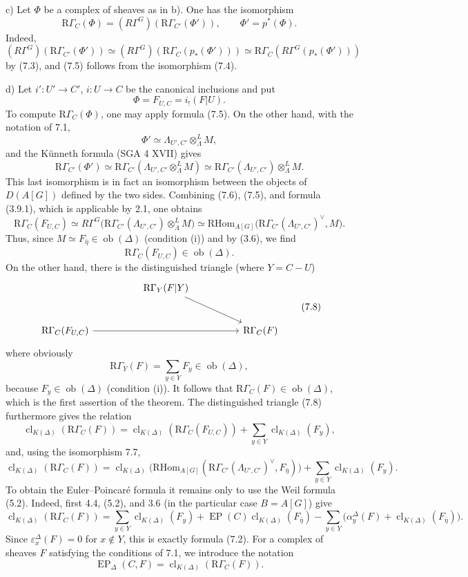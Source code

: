 \documentclass[11pt]{article}
\providecommand{\RHom}{\mathrm{RHom}}
\providecommand{\EP}{\operatorname{EP}}
\providecommand{\Ob}{\operatorname{ob}}
\providecommand{\RHom}{\mathrm{RHom}}
\providecommand{\RHom}{\mathrm R\mathcal{H}om}
\providecommand{\Ob}{\operatorname{ob}}
\providecommand{\EP}{\operatorname{EP}}
\providecommand{\Ob}{\operatorname{Ob}}
\providecommand{\clK}[1]{\operatorname{cl}_{K(#1)}}
\providecommand{\RG}{\mathrm R\Gamma}
\providecommand{\RHom}{\mathrm{RHom}}
\begin{document}
c) Let $\Phi$ be a complex of sheaves as in b). One has the isomorphism
\[
\RG_C(\Phi)=(R\Gamma^G)(\RG_{C'}(\Phi')),
\qquad \Phi'=p^*(\Phi).
\tag{7.5}
\]
Indeed,
\[
(R\Gamma^G)(\RG_{C'}(\Phi'))
\simeq
(R\Gamma^G)(\RG_C(p_*(\Phi')))
\simeq
\RG_C(R\Gamma^G(p_*(\Phi')))
\]
by (7.3), and (7.5) follows from the isomorphism (7.4).

d) Let $i':U'\to C'$, $i:U\to C$ be the canonical inclusions and put
\[
\Phi=F_{U,C}=i_!(F|U).
\]
To compute $\RG_C(\Phi)$, one may apply formula (7.5). On the other hand, with the notation of 7.1,
\[
\Phi'\simeq \Lambda_{U',C'}\otimes_\Lambda^L M,
\]
and the Künneth formula (SGA 4 XVII) gives
\[
\RG_{C'}(\Phi')
\simeq
\RG_{C'}(\Lambda_{U',C'}\otimes_\Lambda^L M)
\simeq
\RG_{C'}(\Lambda_{U',C'})\otimes_\Lambda^L M.
\tag{7.6}
\]
This last isomorphism is in fact an isomorphism between the objects of $D(A[G])$ defined by the two sides. Combining (7.6), (7.5), and formula (3.9.1), which is applicable by 2.1, one obtains
\[
\RG_C(F_{U,C})
\simeq
R\Gamma^G\bigl(\RG_{C'}(\Lambda_{U',C'})\otimes_\Lambda^L M\bigr)
\simeq
\RHom_{A[G]}\bigl(\RG_{C'}(\Lambda_{U',C'})^\vee,M\bigr).
\tag{7.7}
\]
Thus, since $M\simeq F_{\bar\eta}\in\Ob(\Delta)$ (condition (i)) and by (3.6), we find
\[
\RG_C(F_{U,C})\in\Ob(\Delta).
\]
On the other hand, there is the distinguished triangle (where $Y=C-U$)
\[
\begin{tikzcd}[column sep=huge,row sep=large]
& \RG_Y(F|Y) \arrow[dr] & \\
\RG_C(F_{U,C}) \arrow[rr] && \RG_C(F)
\end{tikzcd}
\tag{7.8}
\]
where obviously
\[
\RG_Y(F)=\sum_{y\in Y}F_y\in\Ob(\Delta),
\]
because $F_y\in\Ob(\Delta)$ (condition (i)). It follows that $\RG_C(F)\in\Ob(\Delta)$, which is the first assertion of the theorem. The distinguished triangle (7.8) furthermore gives the relation
\[
\clK{\Delta}(\RG_C(F))
=
\clK{\Delta}(\RG_C(F_{U,C}))
+\sum_{y\in Y}\clK{\Delta}(F_y),
\]
and, using the isomorphism 7.7,
\[
\clK{\Delta}(\RG_C(F))
=
\clK{\Delta}\bigl(\RHom_{A[G]}(\RG_{C'}(\Lambda_{U',C'})^\vee,F_{\bar\eta})\bigr)
+\sum_{y\in Y}\clK{\Delta}(F_y).
\]
To obtain the Euler--Poincaré formula it remains only to use the Weil formula (5.2). Indeed, first 4.4, (5.2), and 3.6 (in the particular case $B=A[G]$) give
\[
\clK{\Delta}(\RG_C(F))
=
\sum_{y\in Y}\clK{\Delta}(F_y)
+\EP(C)\clK{\Delta}(F_{\bar\eta})
-\sum_{y\in Y}\bigl(\alpha_y^\Delta(F)+\clK{\Delta}(F_{\bar\eta})\bigr).
\]
Since $\varepsilon_x^\Delta(F)=0$ for $x\notin Y$, this is exactly formula (7.2). For a complex of sheaves $F$ satisfying the conditions of 7.1, we introduce the notation
\[
\EP_\Delta(C,F)=\clK{\Delta}(\RG_C(F)).
\]
\end{document}
